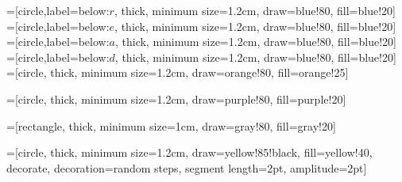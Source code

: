 \usepackage{amsmath}
\usepackage{url}
\usepackage{xcolor}
\usepackage{color}
\usepackage{cancel}
\usepackage{pgfornament}
\usepackage{calligra}
\usepackage{pstricks-add}
\usepackage{metalogo}
\usepackage{scalerel} %
\usepackage{siunitx} %
\def\sgn{\mathop{\rm sgn}}
\usepackage{tikz,pgfplots}
\usepackage{circuitikz}
\usetikzlibrary{
	shapes.geometric,   %
	calc,               %
	positioning,       %
	arrows.meta,        %
	automata,          %
	matrix,            %
	topaths,%
	shapes.misc,       %
	chains,          %
	shadings,          %
	quotes,    %
	angles,   %
	patterns,  %
	fadings,   %
	fit,   %
	decorations.pathmorphing,   %
	decorations.text,
	quotes,through,
	intersections, %
	backgrounds,   %
	shapes,
	arrows,    %
	snakes,
	mindmap, %
	shadows,
	circuits.ee.IEC%
}
=[circle,label=below:$r$,
thick,
minimum size=1.2cm,
draw=blue!80,
fill=blue!20]
=[circle,label=below:$e$,
thick,
minimum size=1.2cm,
draw=blue!80,
fill=blue!20]
=[circle,label=below:$a$,
thick,
minimum size=1.2cm,
draw=blue!80,
fill=blue!20]
=[circle,label=below:$d$,
thick,
minimum size=1.2cm,
draw=blue!80,
fill=blue!20]
=[circle,
thick,
minimum size=1.2cm,
draw=orange!80,
fill=orange!25]

=[circle,
thick,
minimum size=1.2cm,
draw=purple!80,
fill=purple!20]

=[rectangle,
thick,
minimum size=1cm,
draw=gray!80,
fill=gray!20]

=[circle,
thick,
minimum size=1.2cm,
draw=yellow!85!black,
fill=yellow!40,
decorate,
decoration={random steps,
	segment length=2pt,
	amplitude=2pt}]

